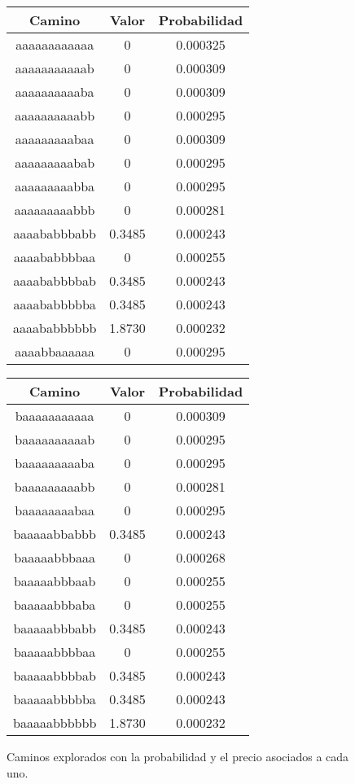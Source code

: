 \begin{problem}[1]
\begin{figure}[hbpt]
\begin{minipage}{0.49\textwidth}
\begin{center}
\begin{tabular}{|c|c|c|}
\hline
\textbf{Camino} & \textbf{Valor} & \textbf{Probabilidad} \\
\hline
aaaaaaaaaaaa  & 0 &  0.000325  \\
aaaaaaaaaaab  & 0 &  0.000309  \\
aaaaaaaaaaba  & 0 &  0.000309  \\
aaaaaaaaaabb  & 0 &  0.000295  \\
aaaaaaaaabaa  & 0 &  0.000309  \\
aaaaaaaaabab  & 0 &  0.000295  \\
aaaaaaaaabba  & 0 &  0.000295  \\
aaaaaaaaabbb  & 0 &  0.000281  \\
aaaababbbabb  &  0.3485  &  0.000243  \\
aaaababbbbaa  & 0 &  0.000255  \\
aaaababbbbab  &  0.3485  &  0.000243  \\
aaaababbbbba  &  0.3485  &  0.000243  \\
aaaababbbbbb  &  1.8730  &  0.000232  \\
aaaabbaaaaaa  & 0 &  0.000295  \\
\hline
\end{tabular}
\end{center}
\end{minipage}
\begin{minipage}{0.49\textwidth}
\begin{center}
\begin{tabular}{|c|c|c|}
\hline
\textbf{Camino} & \textbf{Valor} & \textbf{Probabilidad} \\
\hline
baaaaaaaaaaa  & 0 &  0.000309  \\
baaaaaaaaaab  & 0 &  0.000295  \\
baaaaaaaaaba  & 0 &  0.000295  \\
baaaaaaaaabb  & 0 &  0.000281  \\
baaaaaaaabaa  & 0 &  0.000295  \\
baaaaabbabbb  &  0.3485  &  0.000243  \\
baaaaabbbaaa  & 0 &  0.000268  \\
baaaaabbbaab  & 0 &  0.000255  \\
baaaaabbbaba  & 0 &  0.000255  \\
baaaaabbbabb  &  0.3485  &  0.000243  \\
baaaaabbbbaa  & 0 &  0.000255  \\
baaaaabbbbab  &  0.3485  &  0.000243  \\
baaaaabbbbba  &  0.3485  &  0.000243  \\
baaaaabbbbbb  &  1.8730  &  0.000232  \\
\hline
\end{tabular}
\end{center}
\end{minipage}
\caption{Caminos explorados con la probabilidad y el precio asociados a cada uno.}


\end{figure}
\end{problem}
